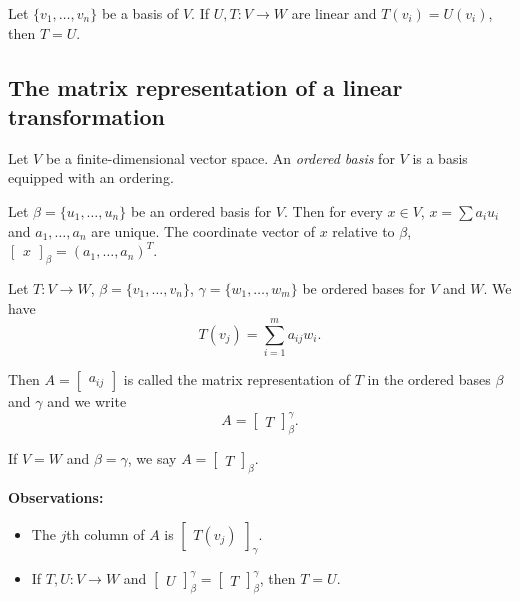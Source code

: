 \documentclass[12pt]{article}
\newenvironment{corollary}[2][Corollary]{\begin{trivlist}
\item[\hskip \labelsep {\bfseries #1}\hskip \labelsep {\bfseries #2}]}{\end{trivlist}}
\newenvironment{definition}[2][Definition]{\begin{trivlist}
\item[\hskip \labelsep {\bfseries #1}\hskip \labelsep {\bfseries #2}]}{\end{trivlist}}
\begin{document}
\begin{corollary}{7}
Let $\{v_1, \dots, v_n\}$ be a basis of $V$. If $U,T : V \to W$ are linear and $T(v_i) = U(v_i)$, then $T = U$.
\end{corollary}

\subsection{The matrix representation of a linear transformation}

\begin{definition}{3}
Let $V$ be a finite-dimensional vector space. An \textit{ordered basis} for $V$ is a basis equipped with an ordering.
\end{definition}

\begin{definition}{4}
Let $\beta = \{u_1, \dots, u_n\}$ be an ordered basis for $V$. Then for every $x \in V$, $x = \sum a_iu_i$ and $a_1,\dots, a_n$ are unique. The coordinate vector of $x$ relative to $\beta$, $\begin{bmatrix} x \end{bmatrix}_\beta = (a_1, \dots, a_n)^T$.
\end{definition}

\noindent Let $T : V \to W$, $\beta = \{v_1, \dots, v_n\}$, $\gamma = \{w_1, \dots, w_m\}$ be ordered bases for $V$ and $W$. We have $$T(v_j) = \sum_{i = 1}^m a_{ij}w_i.$$

\noindent Then $A = \begin{bmatrix} a_{ij} \end{bmatrix}$ is called the matrix representation of $T$ in the ordered bases $\beta$ and $\gamma$ and we write $$A = \begin{bmatrix} T \end{bmatrix}_\beta^\gamma.$$

\noindent If $V = W$ and $\beta = \gamma$, we say $A = \begin{bmatrix} T \end{bmatrix}_\beta$.

\vspace{1em}

\noindent \textbf{Observations:}

\begin{itemize}
    \item The $j$th column of $A$ is $\begin{bmatrix} T(v_j) \end{bmatrix}_\gamma$.
    \item If $T,U : V \to W$ and $\begin{bmatrix} U \end{bmatrix}_\beta^\gamma = \begin{bmatrix} T \end{bmatrix}_\beta^\gamma$, then $T = U$.
\end{itemize}
\end{document}

